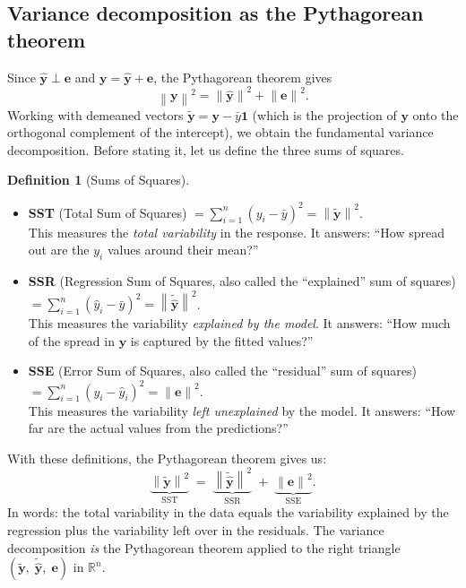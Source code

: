 \documentclass[11pt,a4paper]{article}
\theoremstyle{plain}
\theoremstyle{definition}
\newtheorem{definition}[theorem]{Definition}
\newcommand{\R}{\mathbb{R}}
\newcommand{\yhat}{\hat{\bm{y}}}
\newcommand{\by}{\bm{y}}
\newcommand{\be}{\bm{e}}
\newcommand{\norm}[1]{\left\lVert #1 \right\rVert}
\begin{document}
\subsection{Variance decomposition as the Pythagorean theorem}

Since $\yhat\perp\be$ and $\by = \yhat + \be$, the Pythagorean theorem gives
\begin{equation}\label{eq:pythag}
  \norm{\by}^2 = \norm{\yhat}^2 + \norm{\be}^2.
\end{equation}
Working with demeaned vectors $\tilde{\by}=\by-\bar{y}\bm{1}$
(which is the projection of $\by$ onto the orthogonal complement of
the intercept), we obtain the fundamental variance decomposition.
Before stating it, let us define the three sums of squares.

\begin{definition}[Sums of Squares]\label{def:sums-of-squares}
\leavevmode
\begin{itemize}[nosep]
  \item \textbf{SST} (Total Sum of Squares) $= \sum_{i=1}^n (y_i - \bar{y})^2 = \norm{\tilde{\by}}^2$.\\
    This measures the \emph{total variability} in the response.
    It answers: ``How spread out are the $y_i$ values around their mean?''
  \item \textbf{SSR} (Regression Sum of Squares, also called the ``explained'' sum of squares) $= \sum_{i=1}^n (\hat{y}_i - \bar{y})^2 = \norm{\tilde{\yhat}}^2$.\\
    This measures the variability \emph{explained by the model}.
    It answers: ``How much of the spread in $\by$ is captured by the fitted values?''
  \item \textbf{SSE} (Error Sum of Squares, also called the ``residual'' sum of squares) $= \sum_{i=1}^n (y_i - \hat{y}_i)^2 = \norm{\be}^2$.\\
    This measures the variability \emph{left unexplained} by the model.
    It answers: ``How far are the actual values from the predictions?''
\end{itemize}
\end{definition}

\noindent With these definitions, the Pythagorean theorem gives us:
\[
  \boxed{
  \underbrace{\norm{\tilde{\by}}^2}_{\text{SST}}
  \;=\;
  \underbrace{\norm{\tilde{\yhat}}^2}_{\text{SSR}}
  \;+\;
  \underbrace{\norm{\be}^2}_{\text{SSE}}.
  }
\]
In words: the total variability in the data equals the variability explained by the regression plus the variability left over in the residuals.
The variance decomposition \emph{is} the Pythagorean theorem applied to
the right triangle $(\tilde{\by},\;\tilde{\yhat},\;\be)$ in $\R^n$.
\end{document}

